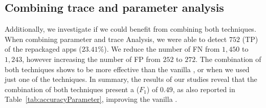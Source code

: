 \subsection{Combining trace and parameter analysis}

Additionally, we investigate if we could benefit from combining both techniques. When combining parameter and trace Analysis, we were able to detect $752$ (TP) of the repackaged apps ($23.41$\%). We reduce the number of FN from $1,450$ to $1,243$, however increasing the number of FP from $252$ to $272$. The combination of both techniques shows to be more effective than the vanilla \mas, or when we used just one of the techniques. In summary, the results of our studies reveal that the combination of both techniques present a ($F_1$) of $0.49$, as also reported in Table~\ref{tab:accuracyParameter}, improving the vanilla \mas.

